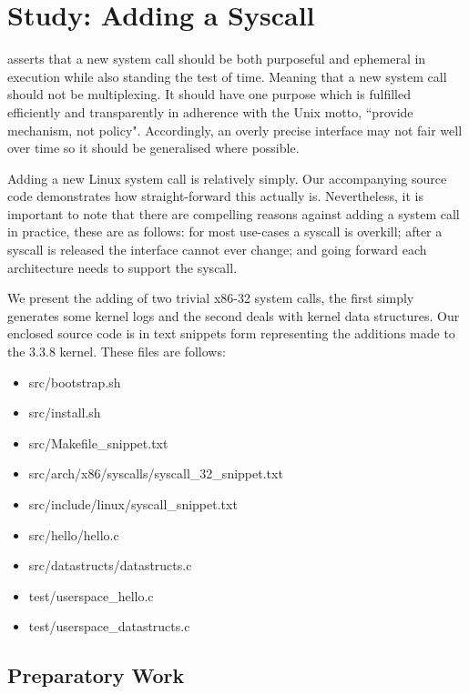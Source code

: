 \documentclass{article}
\begin{document}
\section{Study: Adding a Syscall}

\citet{Love7} asserts that a new system call should be both purposeful and ephemeral in execution while also standing the test of time. 
Meaning that a new system call should not be multiplexing. It should have one purpose which is fulfilled efficiently and transparently 
in adherence with the Unix motto, ``provide mechanism, not policy". Accordingly, 
an overly precise interface may not fair well over time so it should be generalised where possible. 
\par
Adding a new Linux system call is relatively simply. Our accompanying source code demonstrates
how straight-forward this actually is. Nevertheless, it is important to note
that there are compelling reasons against adding 
a system call in practice, these are as follows: for most use-cases a syscall is overkill; 
after a syscall is released the interface cannot ever change;
and going forward each architecture needs to support the syscall.
\par 
We present the adding of two trivial x86-32 system calls, the first simply generates some
kernel logs and the second deals with kernel data structures. Our enclosed 
source code is in text snippets form representing the additions made to
the 3.3.8 kernel. These files are follows:
\begin{itemize}
  \item src/bootstrap.sh
  \item src/install.sh
  \item src/Makefile\_snippet.txt
  \item src/arch/x86/syscalls/syscall\_32\_snippet.txt
  \item src/include/linux/syscall\_snippet.txt
  \item src/hello/hello.c
  \item src/datastructs/datastructs.c
  \item test/userspace\_hello.c
  \item test/userspace\_datastructs.c
\end{itemize}

\subsection{Preparatory Work}
\end{document}
